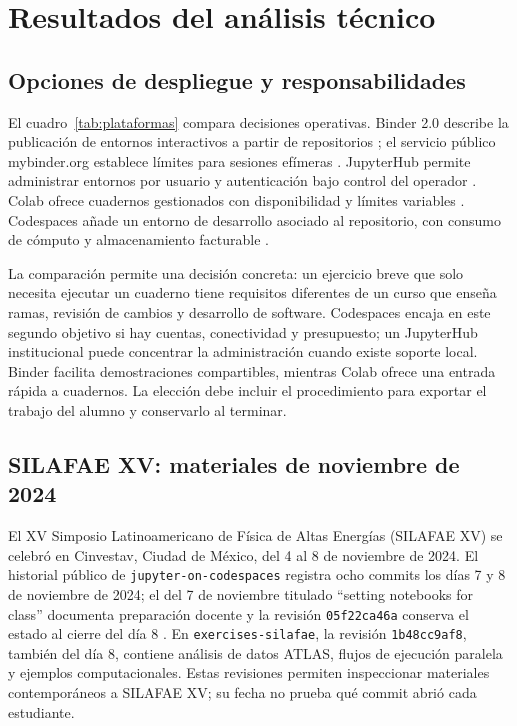 \section{Resultados del análisis técnico}
\subsection{Opciones de despliegue y responsabilidades}
El cuadro~\ref{tab:plataformas} compara decisiones operativas. Binder 2.0 describe la publicación de entornos interactivos a partir de repositorios \cite{binderpaper}; el servicio público mybinder.org establece límites para sesiones efímeras \cite{binder}. JupyterHub permite administrar entornos por usuario y autenticación bajo control del operador \cite{jupyterhub}. Colab ofrece cuadernos gestionados con disponibilidad y límites variables \cite{colab}. Codespaces añade un entorno de desarrollo asociado al repositorio, con consumo de cómputo y almacenamiento facturable \cite{billing}.



La comparación permite una decisión concreta: un ejercicio breve que solo necesita ejecutar un cuaderno tiene requisitos diferentes de un curso que enseña ramas, revisión de cambios y desarrollo de software. Codespaces encaja en este segundo objetivo si hay cuentas, conectividad y presupuesto; un JupyterHub institucional puede concentrar la administración cuando existe soporte local. Binder facilita demostraciones compartibles, mientras Colab ofrece una entrada rápida a cuadernos. La elección debe incluir el procedimiento para exportar el trabajo del alumno y conservarlo al terminar.


\subsection{SILAFAE XV: materiales de noviembre de 2024}
El XV Simposio Latinoamericano de Física de Altas Energías (SILAFAE XV) se celebró en Cinvestav, Ciudad de México, del 4 al 8 de noviembre de 2024. El historial público de \texttt{jupyter-on-codespaces} registra ocho commits los días 7 y 8 de noviembre de 2024; el del 7 de noviembre titulado ``setting notebooks for class'' documenta preparación docente y la revisión \texttt{05f22ca46a} conserva el estado al cierre del día 8 \cite{repos}. En \texttt{exercises-silafae}, la revisión \texttt{1b48cc9af8}, también del día 8, contiene análisis de datos ATLAS, flujos de ejecución paralela y ejemplos computacionales. Estas revisiones permiten inspeccionar materiales contemporáneos a SILAFAE XV; su fecha no prueba qué commit abrió cada estudiante.


